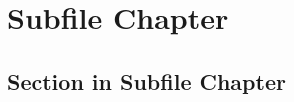 \documentclass[../../document.tex]{subfiles}
\begin{document}
\chapter{Subfile Chapter}
\section{Section in Subfile Chapter}
\end{document}
